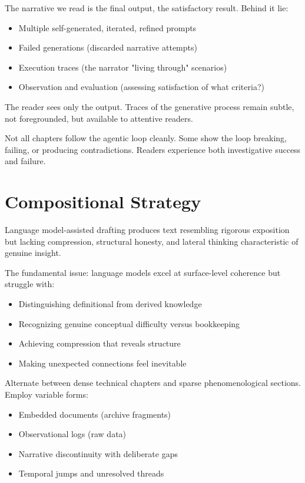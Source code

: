 The narrative we read is the final output, the satisfactory result. Behind it lie:

\begin{itemize}
\item Multiple self-generated, iterated, refined prompts
\item Failed generations (discarded narrative attempts)
\item Execution traces (the narrator "living through" scenarios)
\item Observation and evaluation (assessing satisfaction of what criteria?)
\end{itemize}

The reader sees only the output. Traces of the generative process remain subtle, not foregrounded, but available to attentive readers.

Not all chapters follow the agentic loop cleanly. Some show the loop breaking, failing, or producing contradictions. Readers experience both investigative success and failure.

\section*{Compositional Strategy}

Language model-assisted drafting produces text resembling rigorous exposition but lacking compression, structural honesty, and lateral thinking characteristic of genuine insight.

The fundamental issue: language models excel at surface-level coherence but struggle with:

\begin{itemize}
\item Distinguishing definitional from derived knowledge
\item Recognizing genuine conceptual difficulty versus bookkeeping
\item Achieving compression that reveals structure
\item Making unexpected connections feel inevitable
\end{itemize}

Alternate between dense technical chapters and sparse phenomenological sections. Employ variable forms:

\begin{itemize}
\item Embedded documents (archive fragments)
\item Observational logs (raw data)
\item Narrative discontinuity with deliberate gaps
\item Temporal jumps and unresolved threads
\end{itemize}

